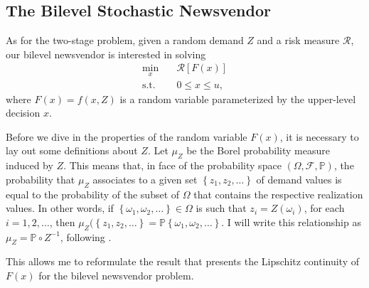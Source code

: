 \documentclass[12pt]{article}
\begin{document}
\subsection*{The Bilevel Stochastic Newsvendor}

As for the two-stage problem, given a random demand $Z$ and a risk measure $\mathcal{R}$, our bilevel newsvendor is interested in solving
\begin{equation}
\begin{split}
    \min_{x} \quad & \mathcal{R}[F(x)] \\
    \textrm{s.t.} \quad & 0\le x\le u
,\end{split}
\end{equation}
where $F(x)=f(x,Z)$ is a random variable parameterized by the upper-level decision $x$.

Before we dive in the properties of the random variable $F(x)$, it is necessary to lay out some definitions about $Z$.
Let $\mu_Z$ be the Borel probability measure induced by $Z$.
This means that, in face of the probability space $\left( \Omega,\mathcal{F},\mathbb{P} \right)$, the probability that $\mu_Z$ associates to a given set $\left\{ z_1,z_2,\ldots \right\} $ of demand values is equal to the probability of the subset of $\Omega$ that contains the respective realization values. 
In other words, if $\left\{ \omega_1,\omega_2,\ldots \right\}\in \Omega$ is such that $z_i=Z(\omega_i)$, for each $i=1,2,\ldots$, then $\mu_Z(\left\{ z_1,z_2,\ldots \right\} = \mathbb{P}\left\{ \omega_1,\omega_2,\ldots \right\}$.
I will write this relationship as $\mu_Z = \mathbb{P} \circ Z^{-1}$, following \citet{burtscheidtBilevelLinearOptimization2020}.

This allows me to reformulate the result that presents the Lipschitz continuity of $F(x)$ for the bilevel newsvendor problem.
\end{document}
